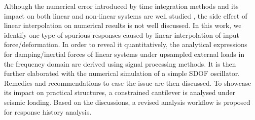 Although the numerical error introduced by time integration methods and its impact on both linear and non-linear systems are well studied \citep[see, e.g.,][]{Chang2003,Chang2005}, the side effect of linear interpolation on numerical results is not well discussed. In this work, we identify one type of spurious responses caused by linear interpolation of input force/deformation. In order to reveal it quantitatively, the analytical expressions for damping/inertial forces of linear systems under upsampled external loads in the frequency domain are derived using signal processing methods. It is then further elaborated with the numerical simulation of a simple SDOF oscillator. Remedies and recommendations to ease the issue are then discussed. To showcase its impact on practical structures, a constrained cantilever is analysed under seismic loading. Based on the discussions, a revised analysis workflow is proposed for response history analysis.